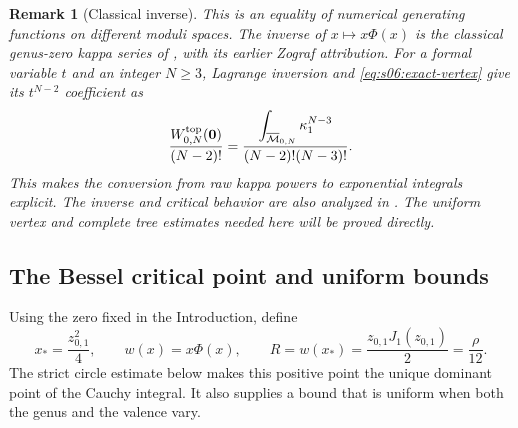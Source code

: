 \documentclass[a4paper,10pt]{article}
\numberwithin{equation}{section}
\newcommand{\MM}{\overline{\mathcal{M}}}
\theoremstyle{paperplain}
\theoremstyle{paperremark}
\newtheorem{rmk}{Remark}[section]
\theoremstyle{paperplain}
\begin{document}
\begin{rmk}[Classical inverse]
This is an equality of numerical generating functions on different
moduli spaces. The inverse of $x\mapsto x\Phi(x)$ is the classical
genus-zero kappa series of \cite[(0.8)]{KMZ96v1}, with its earlier
Zograf attribution. For a formal variable $t$ and an integer $N\geq3$,
Lagrange inversion and \eqref{eq:s06:exact-vertex} give its
$t^{N-2}$ coefficient as
\[
 \frac{W^{\rm top}_{0,N}(\mathbf0)}{(N-2)!}
 =\frac{\displaystyle\int_{\MM_{0,N}}\kappa_1^{N-3}}
        {(N-2)!(N-3)!}.
\]
This makes the conversion from raw kappa powers to exponential
integrals explicit. The inverse and critical behavior are also
analyzed in \cite[\S 6, Proof~6.3]{MaZ00}. The uniform vertex
and complete tree estimates needed here will be proved directly.
\end{rmk}

\subsection{The Bessel critical point and uniform bounds}
\label{subsec:s06:02}

Using the zero fixed in the Introduction, define
\begin{equation}\label{eq:s06:critical-data}
 x_* =\frac{z_{0,1}^2}{4},\qquad
 w(x)=x\Phi(x),\qquad
 R=w(x_*)=\frac{z_{0,1}J_1(z_{0,1})}{2}=\frac{\rho}{12}.
\end{equation}
The strict circle estimate below makes this positive point the
unique dominant point of the Cauchy integral. It also supplies a
bound that is uniform when both the genus and the valence vary.
\end{document}

